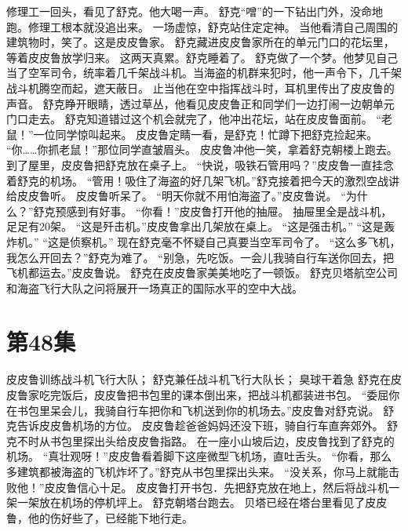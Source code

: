 \documentclass[a4paper,12pt,UTF8,twoside]{ctexbook}
\begin{document}
        修理工一回头，看见了舒克。他大喝一声。 
        舒克“噌”的一下钻出门外，没命地跑。修理工根本就没追出来。 
        一场虚惊，舒克站住定定神。 
        当他看清自己周围的建筑物时，笑了。这是皮皮鲁家。 
        舒克藏进皮皮鲁家所在的单元门口的花坛里，等着皮皮鲁放学归来。 
        这两天真累。舒克睡着了。 
        舒克做了一个梦。他梦见自己当了空军司令，统率着几千架战斗机。当海盗的机群来犯时，他一声令下，几千架战斗机腾空而起，遮天蔽日。 
        止当他在空中指挥战斗时，耳机里传出了皮皮鲁的声音。 
        舒克睁开眼睛，透过草丛，他看见皮皮鲁正和同学们一边打闹一边朝单元门口走去。 
        舒克知道错过这个机会就完了，他冲出花坛，站在皮皮鲁面前。 
        “老鼠！”一位同学惊叫起来。 
        皮皮鲁定睛一看，是舒克！忙蹲下把舒克捡起来。 
        “你……你抓老鼠！”那位同学直皱眉头。 
        皮皮鲁冲他一笑，拿着舒克朝楼上跑去。 
        到了屋里，皮皮鲁把舒克放在桌子上。 
        “快说，吸铁石管用吗？”皮皮鲁一直挂念着舒克的机场。 
        “管用！吸住了海盗的好几架飞机。”舒克接着把今天的激烈空战讲给皮皮鲁听。 
        皮皮鲁听呆了。 
        “明天你就不用怕海盗了。”皮皮鲁说。 
        “为什么？”舒克预感到有好事。 
        “你看！”皮皮鲁打开他的抽屉。 
        抽屉里全是战斗机，足足有20架。 
        “这是歼击机。”皮皮鲁拿出几架放在桌上。 
        “这是强击机。” 
        “这是轰炸机。” 
        “这是侦察机。” 
        现在舒克毫不怀疑自己真要当空军司令了。 
        “这么多飞机，我怎么开回去？”舒克为难了。 
        “别急，先吃饭。一会儿我骑自行车送你回去，把飞机都运去。”皮皮鲁说。 
        舒克在皮皮鲁家美美地吃了一顿饭。 
        舒克贝塔航空公司和海盗飞行大队之问将展开一场真正的国际水平的空中大战。   \chapter{第48集} 
        皮皮鲁训练战斗机飞行大队； 
        舒克兼任战斗机飞行大队长； 
        臭球干着急   
        舒克在皮皮鲁家吃完饭后，皮皮鲁把书包里的课本倒出来，把战斗机都装进书包。 
        “委屈你在书包里呆会儿，我骑自行车把你和飞机送到你的机场去。”皮皮鲁对舒克说。 
        舒克告诉皮皮鲁机场的方位。 
        皮皮鲁趁爸爸妈妈还没下班，骑自行车直奔郊外。 
        舒克不时从书包里探出头给皮皮鲁指路。 
        在一座小山坡后边，皮皮鲁找到了舒克的机场。 
        “真壮观呀！”皮皮鲁看着脚下这座微型飞机场，直吐舌头。 
        “你看，那么多建筑都被海盗的飞机炸坏了。”舒克从书包里探出头来。 
        “没关系，你马上就能击败他！”皮皮鲁信心十足。 
        皮皮鲁打开书包．先把舒克放在地上，然后将战斗机一架一架放在机场的停机坪上。 
        舒克朝塔台跑去。 
        贝塔已经在塔台里看见了皮皮鲁，他的伤好些了，已经能下地行走。 
\end{document}
